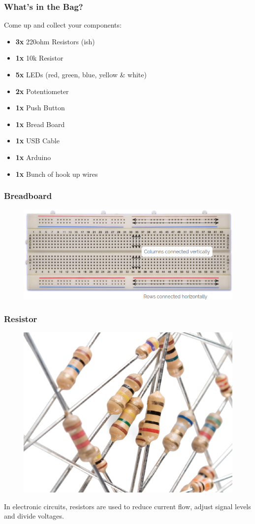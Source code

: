 \begin{frame}
	\frametitle{What's in the Bag?}
	Come up and collect your components:
	\begin{itemize}
		\item \textbf{3x} 220ohm Resistors (ish)
		\item \textbf{1x} 10k Resistor
		\item \textbf{5x} LEDs (red, green, blue, yellow \& white)
		\item \textbf{2x} Potentiometer
		\item \textbf{1x} Push Button
		\item \textbf{1x} Bread Board
		\item \textbf{1x} USB Cable
		\item \textbf{1x} Arduino
		\item \textbf{1x} Bunch of hook up wires
	\end{itemize}
\end{frame}


\begin{frame}
	\frametitle{Breadboard}
	\begin{figure}
		\includegraphics[scale=.4]{assets/bboard}  
	\end{figure}
\end{frame}


\begin{frame}
	\frametitle{Resistor}
	\begin{figure}
   		\includegraphics[scale=.2]{assets/resistor} 
	\end{figure}
	In electronic circuits, resistors are used to reduce current flow, adjust signal levels and divide voltages.
\end{frame}

